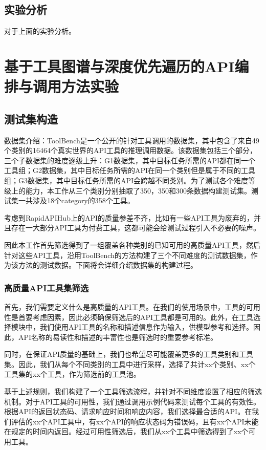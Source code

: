 \subsection{实验分析}

对于上面的实验分析。

\section{基于工具图谱与深度优先遍历的API编排与调用方法实验}

\subsection{测试集构造}

数据集介绍：ToolBench\cite{Qin2023}是一个公开的针对工具调用的数据集，其中包含了来自49个类别的16464个真实世界的API工具的推理调用数据。该数据集包括三个部分，三个子数据集的难度逐级上升：G1数据集，其中目标任务所需的API都在同一个工具组；G2数据集，其中目标任务所需的API在同一个类别但是属于不同的工具组；G3数据集，其中目标任务所需的API会跨越不同类别。为了测试各个难度等级上的能力，本工作从三个类别分别抽取了350，350和300条数据构建测试集。测试集一共涉及18个category的358个工具。

考虑到RapidAPIHub上的API的质量参差不齐，比如有一些API工具为废弃的，并且存在一大部分API工具为付费工具，这都可能会给测试过程引入不必要的噪声。

因此本工作首先筛选得到了一组覆盖各种类别的已知可用的高质量API工具，然后针对这些API工具，沿用ToolBench的方法构建了三个不同难度的测试数据集，作为该方法的测试数据。下面将会详细介绍数据集的构建过程。

\subsubsection{高质量API工具集筛选}

首先，我们需要定义什么是高质量的API工具。在我们的使用场景中，工具的可用性是首要考虑因素，因此必须确保筛选后的API工具都是可用的。此外，在工具选择模块中，我们使用API工具的名称和描述信息作为输入，供模型参考和选择。因此，API名称的易读性和描述的丰富性也是筛选时的重要参考标准。

同时，在保证API质量的基础上，我们也希望尽可能覆盖更多的工具类别和工具集。因此，我们从每个不同类别的工具中进行采样，选择了共计xx个类别、xx个工具集的xx个工具，作为筛选前的工具池。

基于上述规则，我们构建了一个工具筛选流程，并针对不同维度设置了相应的筛选机制。对于API工具的可用性，我们通过调用示例代码来测试每个工具的有效性。根据API的返回状态码、请求响应时间和响应内容，我们选择最合适的API。在我们评估的xx个API工具中，有xx个API的响应状态码为错误码，且有xx个API未能在规定的时间内返回。经过可用性筛选后，我们从xx个工具中筛选得到了xx个可用工具。

